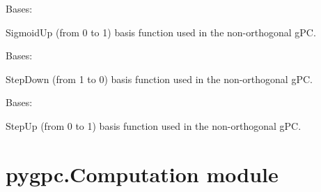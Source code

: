 \documentclass[letterpaper,10pt,english,openany,oneside]{sphinxmanual}
\begin{document}
\begin{fulllineitems}
\label{\detokenize{pygpc:pygpc.BasisFunction.SigmoidUp}}
Bases: {\hyperref[\detokenize{pygpc:pygpc.BasisFunction.BasisFunction}]{}}

SigmoidUp (from 0 to 1) basis function used in the non-orthogonal gPC.

\end{fulllineitems}


\begin{fulllineitems}
\label{\detokenize{pygpc:pygpc.BasisFunction.StepDown}}
Bases: {\hyperref[\detokenize{pygpc:pygpc.BasisFunction.BasisFunction}]{}}

StepDown (from 1 to 0) basis function used in the non-orthogonal gPC.

\end{fulllineitems}


\begin{fulllineitems}
\label{\detokenize{pygpc:pygpc.BasisFunction.StepUp}}
Bases: {\hyperref[\detokenize{pygpc:pygpc.BasisFunction.BasisFunction}]{}}

StepUp (from 0 to 1) basis function used in the non-orthogonal gPC.

\end{fulllineitems}



\section{pygpc.Computation module}
\label{\detokenize{pygpc:module-pygpc.Computation}}\label{\detokenize{pygpc:pygpc-computation-module}}
\end{document}
